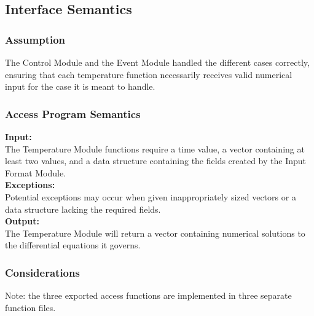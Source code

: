 \documentclass[12pt]{article}
\begin{document}
\subsection{Interface Semantics}


\subsubsection{Assumption}
The Control Module and the Event Module handled the different cases correctly,
 ensuring that each temperature function necessarily receives valid numerical input 
  for the case it is meant to handle.


\subsubsection{Access Program Semantics}

\noindent \textbf{Input:}\\
The Temperature Module functions require a time value, a vector containing at 
least two values, and a data structure containing the fields created by the 
Input Format Module. \\

\noindent \textbf{Exceptions:}\\
Potential exceptions may occur when given inappropriately sized
vectors or a data structure lacking the required fields.\\

\noindent \textbf{Output:}\\
The Temperature Module will return a vector containing numerical solutions to
the differential equations it governs. \\

\subsubsection{Considerations}
Note: the three exported access functions are implemented in three separate function files. 

\end{document}

